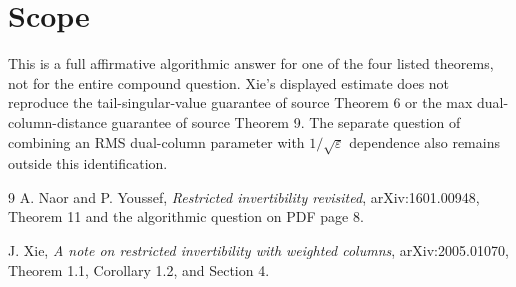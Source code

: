 \documentclass[11pt]{article}
\begin{document}
\section*{Scope}

This is a full affirmative algorithmic answer for one of the four listed
theorems, not for the entire compound question.  Xie's displayed estimate
does not reproduce the tail-singular-value guarantee of source Theorem 6
or the max dual-column-distance guarantee of source Theorem 9.  The
separate question of combining an RMS dual-column parameter with
$1/\sqrt\varepsilon$ dependence also remains outside this identification.

\begin{thebibliography}{9}
A. Naor and P. Youssef,
\emph{Restricted invertibility revisited},
arXiv:1601.00948, Theorem 11 and the algorithmic question on PDF page 8.

J. Xie,
\emph{A note on restricted invertibility with weighted columns},
arXiv:2005.01070, Theorem 1.1, Corollary 1.2, and Section 4.
\end{thebibliography}
\end{document}
